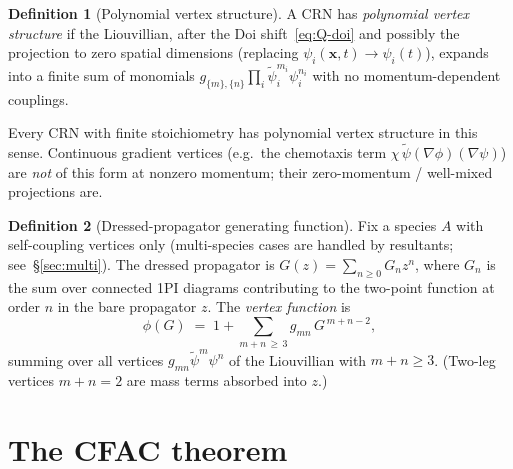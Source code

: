 \documentclass[11pt,a4paper]{article}
\newcommand{\psit}{\tilde\psi}
\theoremstyle{plain}
\theoremstyle{definition}
\newtheorem{definition}{Definition}
\begin{document}
\begin{definition}[Polynomial vertex structure]
A CRN has \emph{polynomial vertex structure} if the Liouvillian,
after the Doi shift~\eqref{eq:Q-doi} and possibly the projection
to zero spatial dimensions (replacing $\psi_i(\mathbf{x},t) \to
\psi_i(t)$), expands into a finite sum of monomials
$g_{\{m\},\{n\}}\prod_i\psit_i^{m_i}\psi_i^{n_i}$ with no
momentum-dependent couplings.
\end{definition}

Every CRN with finite stoichiometry has polynomial vertex
structure in this sense.  Continuous gradient vertices (e.g.\ the
chemotaxis term $\chi\,\psit(\nabla\phi)(\nabla\psi)$) are
\emph{not} of this form at nonzero momentum; their
zero-momentum / well-mixed projections are.

\begin{definition}[Dressed-propagator generating function]
Fix a species $A$ with self-coupling vertices only (multi-species
cases are handled by resultants; see~\S\ref{sec:multi}).  The
dressed propagator is
$G(z) = \sum_{n \geq 0} G_n z^n$, where $G_n$ is the sum over
connected 1PI diagrams contributing to the two-point function at
order $n$ in the bare propagator $z$.  The \emph{vertex function}
is
\begin{equation}\label{eq:phi-def}
  \phi(G) \;=\; 1 + \sum_{m+n\,\geq\,3}
    g_{m n}\,G^{\,m + n - 2},
\end{equation}
summing over all vertices $g_{m n}\psit^{m}\psi^{n}$ of the
Liouvillian with $m + n \geq 3$.  (Two-leg vertices $m + n = 2$
are mass terms absorbed into $z$.)
\end{definition}

\section{The CFAC theorem}
\label{sec:theorem}
\end{document}
